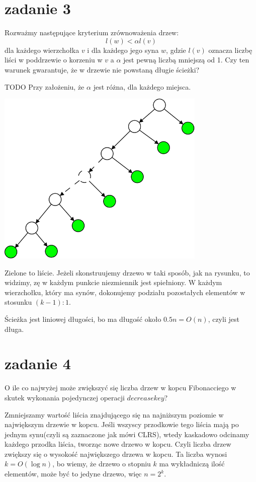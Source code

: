 \section{zadanie 3}
\begin{framed}
 Rozważmy następujące kryterium zrównoważenia drzew:
$$ l(w) < \alpha l(v) $$
dla każdego wierzchołka $v$ i dla każdego jego syna $w$, gdzie $l(v)$ oznacza liczbę liści w poddrzewie o korzeniu w $v$ a $\alpha$ jest pewną liczbą mniejszą od 1.
Czy ten warunek gwarantuje, że w drzewie nie powstaną długie ścieżki?
\end{framed}
TODO Przy założeniu, że $\alpha$ jest różna, dla każdego miejsca.

  \includegraphics[width=10cm]{images/3.png}
  
Zielone to liście.
Jeżeli skonstruujemy drzewo w taki sposób, jak na rysunku, to widzimy, zę w każdym punkcie niezmiennik jest spiełniony.
W każdym wierzchołku, który ma synów, dokonujemy podziału pozostałych elementów w stosunku $(k-1):1$.

Ścieżka jest liniowej długości, bo ma długość około $0.5n = O(n)$, czyli jest długa.

\section{zadanie 4}
\begin{framed}
O ile co najwyżej może zwiększyć się liczba drzew w kopcu Fibonacciego w skutek wykonania  pojedynczej operacji $decreasekey$?
\end{framed}
Zmniejszamy wartość liścia znajdującego się na najniższym poziomie w największym drzewie w kopcu. Jeśli wszyscy przodkowie tego liścia mają po jednym synu(czyli są zaznaczone jak mówi CLRS), wtedy kaskadowo odcinamy każdego przodka liścia, tworząc nowe drzewo w kopcu.
Czyli liczba drzew zwiększy się o wysokość największego drzewa w kopcu.
Ta liczba wynosi $k = O(\log n)$, bo wiemy, że drzewo o stopniu $k$ ma wykładniczą ilość elementów, może być to jedyne drzewo, więc $n=2^k$.

